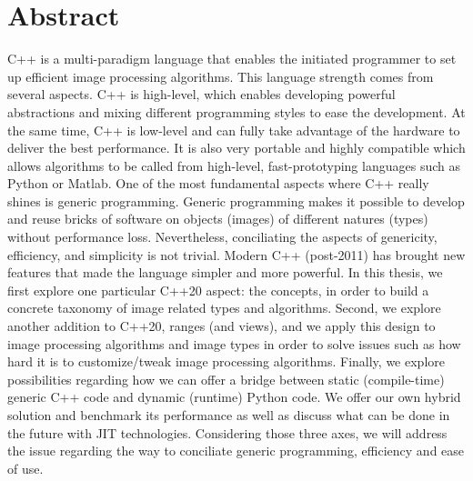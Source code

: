 \section*{Abstract}
\label{sec:abstract}
C++ is a multi-paradigm language that enables the initiated programmer to set up efficient image processing algorithms.
This language strength comes from several aspects. C++ is high-level, which enables developing powerful abstractions and
mixing different programming styles to ease the development. At the same time, C++ is low-level and can fully take
advantage of the hardware to deliver the best performance. It is also very portable and highly compatible which allows
algorithms to be called from high-level, fast-prototyping languages such as Python or Matlab. One of the most
fundamental aspects where C++ really shines is generic programming. Generic programming makes it possible to develop and
reuse bricks of software on objects (images) of different natures (types) without performance loss. Nevertheless,
conciliating the aspects of genericity, efficiency, and simplicity is not trivial. Modern C++ (post-2011) has brought
new features that made the language simpler and more powerful. In this thesis, we first explore one particular C++20
aspect: the concepts, in order to build a concrete taxonomy of image related types and algorithms. Second, we explore
another addition to C++20, ranges (and views), and we apply this design to image processing algorithms and image types
in order to solve issues such as how hard it is to customize/tweak image processing algorithms. Finally, we explore
possibilities regarding how we can offer a bridge between static (compile-time) generic C++ code and dynamic (runtime)
Python code. We offer our own hybrid solution and benchmark its performance as well as discuss what can be done in the
future with JIT technologies. Considering those three axes, we will address the issue regarding the way to conciliate
generic programming, efficiency and ease of use.

\bigskip

\bigskip

